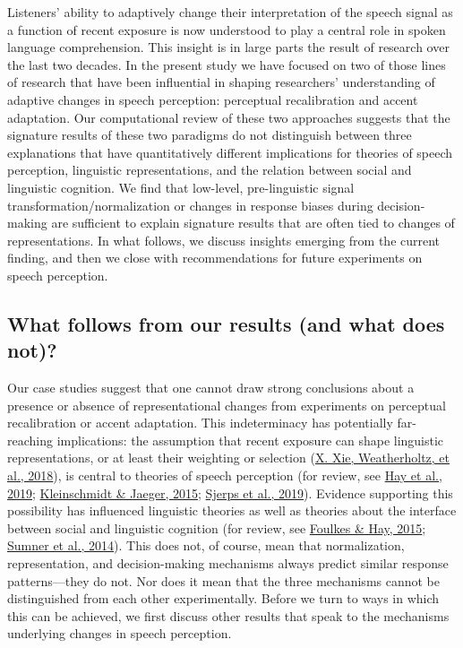 \documentclass[
  11pt,
  man,floatsintext]{apa6}
\begin{document}
Listeners' ability to adaptively change their interpretation of the speech signal as a function of recent exposure is now understood to play a central role in spoken language comprehension. This insight is in large parts the result of research over the last two decades. In the present study we have focused on two of those lines of research that have been influential in shaping researchers' understanding of adaptive changes in speech perception: perceptual recalibration and accent adaptation. Our computational review of these two approaches suggests that the signature results of these two paradigms do not distinguish between three explanations that have quantitatively different implications for theories of speech perception, linguistic representations, and the relation between social and linguistic cognition. We find that low-level, pre-linguistic signal transformation/normalization or changes in response biases during decision-making are sufficient to explain signature results that are often tied to changes of representations. In what follows, we discuss insights emerging from the current finding, and then we close with recommendations for future experiments on speech perception.

\hypertarget{what-follows-from-our-results-and-what-does-not}{%
\subsection{What follows from our results (and what does not)?}\label{what-follows-from-our-results-and-what-does-not}}

Our case studies suggest that one cannot draw strong conclusions about a presence or absence of representational changes from experiments on perceptual recalibration or accent adaptation. This indeterminacy has potentially far-reaching implications: the assumption that recent exposure can shape linguistic representations, or at least their weighting or selection (\protect\hyperlink{ref-xie2018jasa}{X. Xie, Weatherholtz, et al., 2018}), is central to theories of speech perception (for review, see \protect\hyperlink{ref-hay2019}{Hay et al., 2019}; \protect\hyperlink{ref-kleinschmidt-jaeger2015}{Kleinschmidt \& Jaeger, 2015}; \protect\hyperlink{ref-sjerps2019}{Sjerps et al., 2019}). Evidence supporting this possibility has influenced linguistic theories as well as theories about the interface between social and linguistic cognition (for review, see \protect\hyperlink{ref-foulkes-hay2015}{Foulkes \& Hay, 2015}; \protect\hyperlink{ref-sumner2014}{Sumner et al., 2014}). This does not, of course, mean that normalization, representation, and decision-making mechanisms always predict similar response patterns---they do not. Nor does it mean that the three mechanisms cannot be distinguished from each other experimentally. Before we turn to ways in which this can be achieved, we first discuss other results that speak to the mechanisms underlying changes in speech perception.
\end{document}
